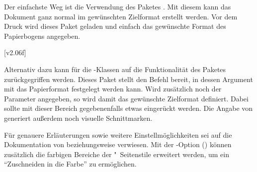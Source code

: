 Der einfachste Weg ist die Verwendung des Paketes . Mit diesem 
kann das Dokument ganz normal im gewünschten Zielformat erstellt werden. Vor 
dem Druck wird dieses Paket geladen und einfach das gewünschte Format des 
Papierbogens angegeben. 
%
\begin{quoting}[rightmargin=0pt]
\end{quoting}
%
[v2.06f]%
\begin{Bundle}{}
Alternativ dazu kann für die \TUDScript-Klassen auf die Funktionalität des 
Paketes  zurückgegriffen werden. Dieses Paket stellt den 
Befehl  bereit, in dessen Argument mit
 das Papierformat festgelegt 
werden kann. Wird zusätzlich noch der Parameter 
 angegeben, so wird damit das 
gewünschte Zielformat definiert. Dabei sollte mit 
 dieser Bereich gegebenenfalls 
etwas eingerückt werden. Die Angabe von 
 generiert außerdem noch visuelle 
Schnittmarken.
\end{Bundle}
%
\begin{quoting}[rightmargin=0pt]
\end{quoting}
%
Für genauere Erläuterungen sowie weitere Einstellmöglichkeiten sei auf die 
Dokumentation von  beziehungsweise  verwiesen.
Mit der \TUDScript-Option () können
zusätzlich die farbigen Bereiche der "~Seitenstile 
erweitert werden, um ein \enquote{Zuschneiden in die Farbe} zu ermöglichen.





